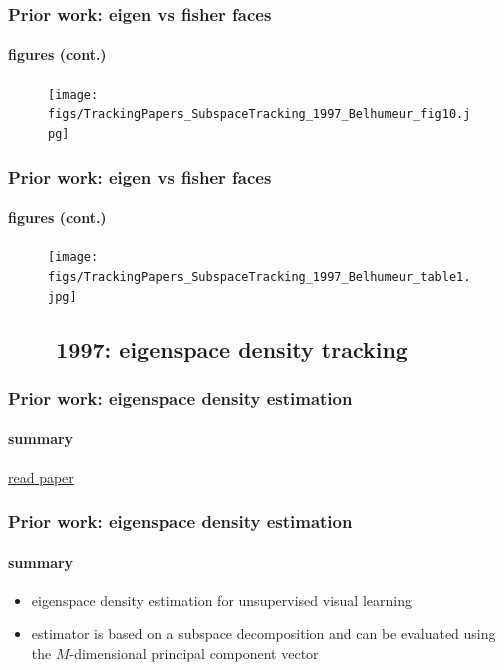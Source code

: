 \begin{frame}
\frametitle{Prior work: eigen vs fisher faces}
\framesubtitle{figures (cont.)}
\mypagenum
	\begin{figure}
		\texttt{[image: figs/TrackingPapers\_SubspaceTracking\_1997\_Belhumeur\_fig10.jpg]}
	\end{figure}
\end{frame}



\begin{frame}
\frametitle{Prior work: eigen vs fisher faces}
\framesubtitle{figures (cont.)}
\mypagenum
	\begin{figure}
		\texttt{[image: figs/TrackingPapers\_SubspaceTracking\_1997\_Belhumeur\_table1.jpg]}
	\end{figure}
\end{frame}






\subsection{\ \ \ \ 1997: eigenspace density tracking}
\begin{frame}
\frametitle{Prior work: eigenspace density estimation}
\framesubtitle{summary}
\mypagenum
		{\color{blue}  \href{http://users.ece.gatech.edu/~msalman/papers/1997 JNL, Probabilistic visual learning for object representation (Moghaddam, Pentland, PAMI, 1163).pdf}{read paper}}
\end{frame}



\begin{frame}
\frametitle{Prior work: eigenspace density estimation}
\framesubtitle{summary}
\mypagenum
	\begin{itemize}
		\item eigenspace density estimation for unsupervised visual learning
		\item estimator is based on a subspace decomposition and can be evaluated using the $M$-dimensional principal component vector
	\end{itemize}
\end{frame}



